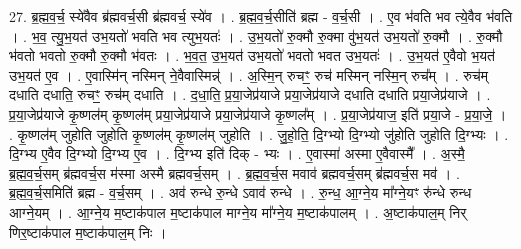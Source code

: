 \documentclass[17pt]{extarticle}
\begin{document}
27. ब्र॒ह्म॒व॒र्च॒ स्ये॑वैव ब्र॑ह्मवर्च॒सी ब्र॑ह्मवर्च॒ स्ये॑व । . ब्र॒ह्म॒व॒र्च॒सीति॑ ब्रह्म - व॒र्च॒सी । . ए॒व भ॑वति भव त्ये॒वैव भ॑वति । . भ॒व॒ त्यु॒भ॒यत॑ उभ॒यतो॑ भवति भव त्युभ॒यतः॑ । . उ॒भ॒यतो॑ रु॒क्मौ रु॒क्मा वु॑भ॒यत॑ उभ॒यतो॑ रु॒क्मौ । . रु॒क्मौ भ॑वतो भवतो रु॒क्मौ रु॒क्मौ भ॑वतः । . भ॒व॒त॒ उ॒भ॒यत॑ उभ॒यतो॑ भवतो भवत उभ॒यतः॑ । . उ॒भ॒यत॑ ए॒वैवो भ॒यत॑ उभ॒यत॑ ए॒व । . ए॒वास्मि॑न् नस्मिन् ने॒वैवास्मिन्न्॑ । . अ॒स्मि॒न् रुचꣳ॒॒ रुच॑ मस्मिन् नस्मि॒न् रुच᳚म् । . रुच॑म् दधाति दधाति॒ रुचꣳ॒॒ रुच॑म् दधाति । . द॒धा॒ति॒ प्र॒या॒जेप्र॑याजे प्रया॒जेप्र॑याजे दधाति दधाति प्रया॒जेप्र॑याजे । . प्र॒या॒जेप्र॑याजे कृ॒ष्णल॑म् कृ॒ष्णल॑म् प्रया॒जेप्र॑याजे प्रया॒जेप्र॑याजे कृ॒ष्णल᳚म् । . प्र॒या॒जेप्र॑याज॒ इति॑ प्रया॒जे - प्र॒या॒जे॒ । . कृ॒ष्णल॑म् जुहोति जुहोति कृ॒ष्णल॑म् कृ॒ष्णल॑म् जुहोति । . जु॒हो॒ति॒ दि॒ग्भ्यो दि॒ग्भ्यो जु॑होति जुहोति दि॒ग्भ्यः । . दि॒ग्भ्य ए॒वैव दि॒ग्भ्यो दि॒ग्भ्य ए॒व । . दि॒ग्भ्य इति॑ दिक् - भ्यः । . ए॒वास्मा॑ अस्मा ए॒वैवास्मै᳚ । . अ॒स्मै॒ ब्र॒ह्म॒व॒र्च॒सम् ब्र॑ह्मवर्च॒स म॑स्मा अस्मै ब्रह्मवर्च॒सम् । . ब्र॒ह्म॒व॒र्च॒स मवाव॑ ब्रह्मवर्च॒सम् ब्र॑ह्मवर्च॒स मव॑ । . ब्र॒ह्म॒व॒र्च॒समिति॑ ब्रह्म - व॒र्च॒सम् । . अव॑ रुन्धे रु॒न्धे ऽवाव॑ रुन्धे । . रु॒न्ध॒ आ॒ग्ने॒य मा᳚ग्ने॒यꣳ रु॑न्धे रुन्ध आग्ने॒यम् । . आ॒ग्ने॒य म॒ष्टाक॑पाल म॒ष्टाक॑पाल माग्ने॒य मा᳚ग्ने॒य म॒ष्टाक॑पालम् । . अ॒ष्टाक॑पाल॒म् निर् णिर॒ष्टाक॑पाल म॒ष्टाक॑पाल॒म् निः । \newline
\end{document}
